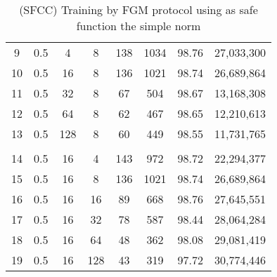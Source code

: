 \begin{table}[H]
\begin{tabular}{|c|c|c|c|c|c|c|c|}
        9                      & 0.5                   & 4                     & 8                     & 138                   & 1034                  & 98.76                 & 27,033,300               \\
        10                     & 0.5                   & 16                    & 8                     & 136                   & 1021                  & 98.74                 & 26,689,864               \\
        11                     & 0.5                   & 32                    & 8                     & 67                    & 504                   & 98.67                 & 13,168,308               \\
        12                     & 0.5                   & 64                    & 8                     & 62                    & 467                   & 98.65                 & 12,210,613               \\
        13                     & 0.5                   & 128                   & 8                     & 60                    & 449                   & 98.55                 & 11,731,765               \\
        \hline
        \multicolumn{1}{|l|}{} & \multicolumn{1}{l|}{} & \multicolumn{1}{l|}{} & \multicolumn{1}{l|}{} & \multicolumn{1}{l|}{} & \multicolumn{1}{l|}{} & \multicolumn{1}{l|}{} & \multicolumn{1}{l|}{}    \\
        \hline
        14                     & 0.5                   & 16                    & 4                     & 143                   & 972                   & 98.72                 & 22,294,377               \\
        15                     & 0.5                   & 16                    & 8                     & 136                   & 1021                  & 98.74                 & 26,689,864               \\
        16                     & 0.5                   & 16                    & 16                    & 89                    & 668                   & 98.76                 & 27,645,551               \\
        17                     & 0.5                   & 16                    & 32                    & 78                    & 587                   & 98.44                 & 28,064,284               \\
        18                     & 0.5                   & 16                    & 64                    & 48                    & 362                   & 98.08                 & 29,081,419               \\
        19                     & 0.5                   & 16                    & 128                   & 43                    & 319                   & 97.72                 & 30,774,446               \\
        \hline
    \end{tabular}
    \caption{(SFCC) Training by FGM protocol using as safe function the simple norm}
    \label{tab:table-fgm-sf1-class-exp}
\end{table}

